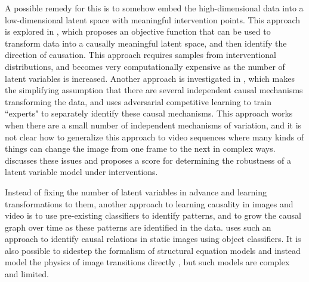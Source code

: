 \documentclass[letterpaper, twocolumn]{article} %
\begin{document}
A possible remedy for this is to somehow embed the high-dimensional data into a low-dimensional latent space with meaningful intervention points. This approach is explored in \cite{bengio2019meta}, which proposes an objective function that can be used to transform data into a causally meaningful latent space, and then identify the direction of causation. This approach requires samples from interventional distributions, and becomes very computationally expensive as the number of latent variables is increased. Another approach is investigated in \cite{parascandolo2017learning}, which makes the simplifying assumption that there are several independent causal mechanisms transforming the data, and uses adversarial competitive learning to train ``experts" to separately identify these causal mechanisms. This approach works when there are a small number of independent mechanisms of variation, and it is not clear how to generalize this approach to video sequences where many kinds of things can change the image from one frame to the next in complex ways. \cite{suter2018interventional} discusses these issues and proposes a score for determining the robustness of a latent variable model under interventions.

Instead of fixing the number of latent variables in advance and learning transformations to them, another approach to learning causality in images and video is to use pre-existing classifiers to identify patterns, and to grow the causal graph over time as these patterns are identified in the data. \cite{lopez2017discovering} uses such an approach to identify causal relations in static images using object classifiers. It is also possible to sidestep the formalism of structural equation models and instead model the physics of image transitions directly \cite{brubaker2009estimating} \cite{watter2015embed}, but such models are complex and limited.
\end{document}
